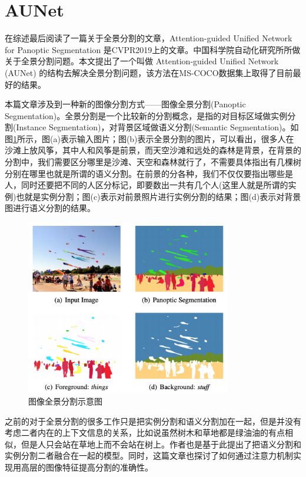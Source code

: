\documentclass[cn]{elegantbook}
\begin{document}
\section{AUNet}
在综述最后阅读了一篇关于全景分割的文章，Attention-guided Unified Network for Panoptic Segmentation\cite{li2018attention} 是CVPR2019上的文章。中国科学院自动化研究所所做关于全景分割问题。本文提出了一个叫做 Attention-guided Unified Network (AUNet) 的结构去解决全景分割问题，该方法在MS-COCO数据集上取得了目前最好的结果。

本篇文章涉及到一种新的图像分割方式——图像全景分割(Panoptic Segmentation)。全景分割是一个比较新的分割概念，是指的对目标区域做实例分割(Instance Segmentation)，对背景区域做语义分割(Semantic Segmentation)。如图\ref{paseg}所示，图(a)表示输入图片；图(b)表示全景分割的图片，可以看出，很多人在沙滩上放风筝，其中人和风筝是前景，而天空沙滩和远处的森林是背景，在背景的分割中，我们需要区分哪里是沙滩、天空和森林就行了，不需要具体指出有几棵树分别在哪里也就是所谓的语义分割。在前景的分各种，我们不仅仅要指出哪些是人，同时还要把不同的人区分标记，即要数出一共有几个人(这里人就是所谓的实例)也就是实例分割；图(c)表示对前景照片进行实例分割的结果；图(d)表示对背景图进行语义分割的结果。

\begin{figure}[h]
	\centering
	\includegraphics[width=0.8\textwidth]{images/paseg}
	\caption{\label{paseg}图像全景分割示意图}
\end{figure}

之前的对于全景分割的很多工作只是把实例分割和语义分割加在一起，但是并没有考虑二者内在的上下文信息的关系，比如说虽然树木和草地都是绿油油的有点相似，但是人只会站在草地上而不会站在树上。作者也是基于此提出了把语义分割和实例分割二者融合在一起的模型。同时，这篇文章也探讨了如何通过注意力机制实现用高层的图像特征提高分割的准确性。
\end{document}
